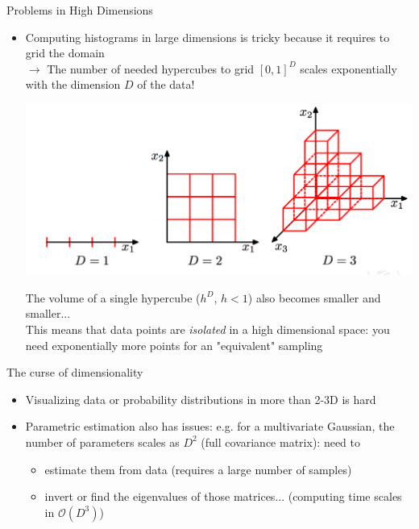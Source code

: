 \documentclass{beamer}
\begin{document}
\begin{frame}{Problems in High Dimensions}

\begin{itemize}
\item Computing histograms in large dimensions is tricky because it requires to grid the domain\\
$\rightarrow$ The number of needed hypercubes to grid $[0,1]^{D}$ scales exponentially with the dimension $D$ of the data!\\
\begin{center}
\includegraphics[scale=1]{hypercubes.png}
\end{center}
The volume of a single hypercube ($h^D$, $h<1$) also becomes smaller and smaller...\\
This means that data points are \emph{isolated} in a high dimensional space: you need exponentially more points for an "equivalent" sampling


\end{itemize}

\end{frame}

\begin{frame}{The curse of dimensionality}
\begin{itemize}
\item Visualizing data or probability distributions in more than 2-3D is hard
\item Parametric estimation also has issues: e.g. for a multivariate Gaussian, the number of parameters scales as $D^2$ (full covariance matrix): need to 
\begin{itemize}
\item estimate them from data (requires a large number of samples)
\item invert or find the eigenvalues of those matrices... (computing time scales in $\mathcal{O}(D^3)$)
\end{itemize}

\end{itemize}
\end{frame}
\end{document}
